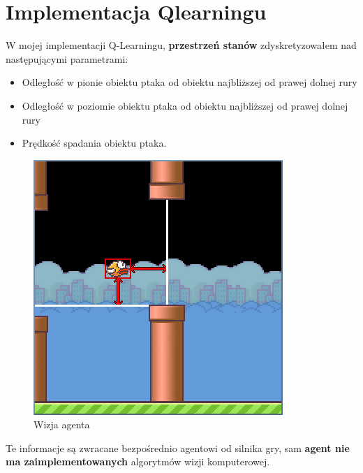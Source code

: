 \documentclass[a4paper, 12pt,oneside]{book}
\begin{document}
\chapter{Implementacja Q\dywiz learningu}
\label{chapter:implementacja_qlearningu}
W mojej implementacji Q-Learningu, \textbf{przestrzeń stanów} zdyskretyzowałem
nad następującymi parametrami:
\begin{itemize}
	\setlength\itemsep{-0.4em}
	\item Odległość w pionie obiektu ptaka od obiektu najbliższej od prawej
		dolnej rury
	\item Odległość w poziomie obiektu ptaka od obiektu najbliższej od 
		prawej dolnej rury
	\item Prędkość spadania obiektu ptaka.
\end{itemize}
\begin{figure}[!htb]
	\begin{center}
	\includegraphics[scale=0.80]{agent_vision.png}
	\end{center}
	\caption{Wizja agenta}
	\label{agent_vision}
\end{figure}

Te informacje są zwracane bezpośrednio agentowi od silnika gry, sam 
\textbf{agent nie ma zaimplementowanych} algorytmów wizji komputerowej.
\end{document}
